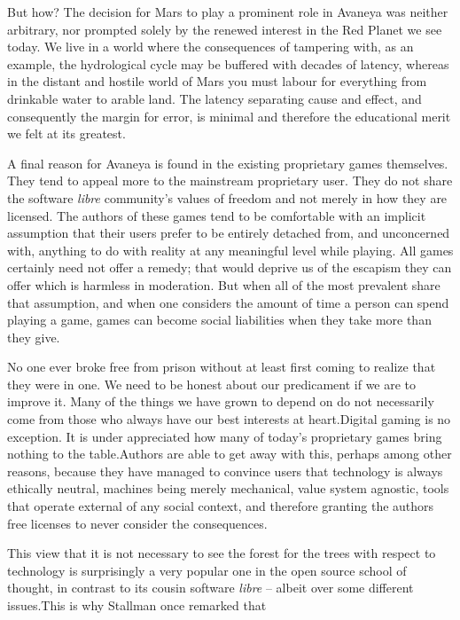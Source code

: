 But how? The decision for Mars to play a prominent role in Avaneya was neither arbitrary, nor prompted solely by the renewed interest in the Red Planet we see today. We live in a world where the consequences of tampering with, as an example, the hydrological cycle may be buffered with decades of latency, whereas in the distant and hostile world of Mars you must labour for everything from drinkable water to arable land. The latency separating cause and effect, and consequently the margin for error, is minimal and therefore the educational merit we felt at its greatest.

A final reason for Avaneya is found in the existing proprietary games themselves. They tend to appeal more to the mainstream proprietary user. They do not share the software {\it libre} community's values of freedom and not merely in how they are licensed. The authors of these games tend to be comfortable with an implicit assumption that their users prefer to be entirely detached from, and unconcerned with, anything to do with reality at any meaningful level while playing. All games certainly need not offer a remedy; that would deprive us of the escapism they can offer which is harmless in moderation. But when all of the most prevalent share that assumption, and when one considers the amount of time a person can spend playing a game, games can become social liabilities when they take more than they give.

No one ever broke free from prison without at least first coming to realize that they were in one. We need to be honest about our predicament if we are to improve it. Many of the things we have grown to depend on do not necessarily come from those who always have our best interests at heart.\footnotecite[santoso2008] Digital gaming is no exception. It is under appreciated how many of today's proprietary games bring nothing to the table. Authors are able to get away with this, perhaps among other reasons, because they have managed to convince users that technology is always ethically neutral, machines being merely mechanical, value system agnostic, tools that operate external of any social context, and therefore granting the authors free licenses to never consider the consequences.

This view that it is not necessary to see the forest for the trees with respect to technology is surprisingly a very popular one in the open source school of thought, in contrast to its cousin software {\it libre} -- albeit over some different issues. This is why Stallman once remarked that \footnotecite[auza2008] 

